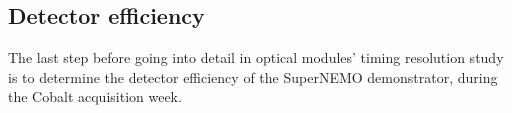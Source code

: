 





\subsection{Detector efficiency}
\label{subsec:detector_efficiency}


The last step before going into detail in optical modules' timing resolution study is to determine the detector efficiency of the SuperNEMO demonstrator, during the Cobalt acquisition week.

